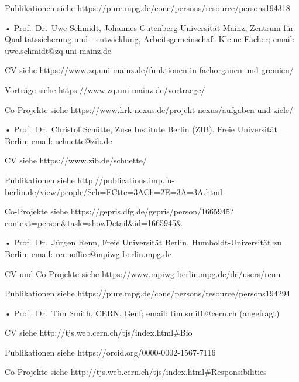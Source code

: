 \documentclass[
]{article}
\begin{document}
Publikationen siehe
https://pure.mpg.de/cone/persons/resource/persons194318

• Prof.~Dr.~Uwe Schmidt, Johannes-Gutenberg-Universität Mainz, Zentrum
für Qualitätssicherung und - entwicklung, Arbeitsgemeinschaft Kleine
Fächer; email: uwe.schmidt@zq.uni-mainz.de

CV siehe
https://www.zq.uni-mainz.de/funktionen-in-fachorganen-und-gremien/

Vorträge siehe https://www.zq.uni-mainz.de/vortraege/

Co-Projekte siehe
https://www.hrk-nexus.de/projekt-nexus/aufgaben-und-ziele/

• Prof.~Dr.~Christof Schütte, Zuse Institute Berlin (ZIB), Freie
Universität Berlin; email: schuette@zib.de

CV siehe https://www.zib.de/schuette/

Publikationen siehe
http://publications.imp.fu-berlin.de/view/people/Sch=FCtte=3ACh=2E=3A=3A.html

Co-Projekte siehe
https://gepris.dfg.de/gepris/person/1665945?context=person\&task=showDetail\&id=1665945\&

• Prof.~Dr.~Jürgen Renn, Freie Universität Berlin, Humboldt-Universität
zu Berlin; email: rennoffice@mpiwg-berlin.mpg.de

CV und Co-Projekte siehe https://www.mpiwg-berlin.mpg.de/de/users/renn

Publikationen siehe
https://pure.mpg.de/cone/persons/resource/persons194294

• Prof.~Dr.~Tim Smith, CERN, Genf; email: tim.smith@cern.ch (angefragt)

CV siehe http://tjs.web.cern.ch/tjs/index.html\#Bio

Publikationen siehe https://orcid.org/0000-0002-1567-7116

Co-Projekte siehe
http://tjs.web.cern.ch/tjs/index.html\#Responsibilities
\end{document}
